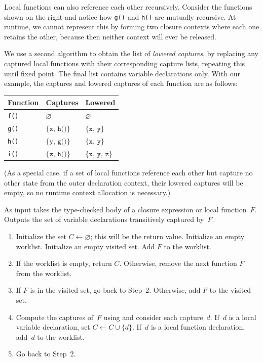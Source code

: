 \documentclass[../generics]{subfiles}
\begin{document}
Local functions can also reference each other recursively. Consider the functions shown on the right and notice how \texttt{g()} and \texttt{h()} are mutually recursive. At runtime, we cannot represent this by forming two closure contexts where each one retains the other, because then neither context will ever be released.

We use a second algorithm to obtain the list of \emph{lowered captures}, by replacing any captured local functions with their corresponding capture lists, repeating this until fixed point. The final list contains variable declarations only. With our example, the captures and lowered captures of each function are as follows:

\begin{center}
\begin{tabular}{lll}
\toprule
\textbf{Function}&\textbf{Captures}&\textbf{Lowered}\\
\midrule
\texttt{f()}&$\varnothing$&$\varnothing$\\
\texttt{g()}&$\{\texttt{x},\,\texttt{h()}\}$&$\{\texttt{x},\,\texttt{y}\}$\\
\texttt{h()}&$\{\texttt{y},\,\texttt{g()}\}$&$\{\texttt{x},\,\texttt{y}\}$\\
\texttt{i()}&$\{\texttt{z},\,\texttt{h()}\}$&$\{\texttt{x},\,\texttt{y},\,\texttt{z}\}$\\
\bottomrule
\end{tabular}
\end{center}

(As a special case, if a set of local functions reference each other but capture no other state from the outer declaration context, their lowered captures will be empty, so no runtime context allocation is necessary.)

\begin{algorithm}\label{lowered closure captures algorithm}
As input takes the type-checked body of a closure expression or local function~$F$. Outputs the set of variable declarations transitively captured by~$F$.
\begin{enumerate}
\item Initialize the set $C\leftarrow\varnothing$; this will be the return value. Initialize an empty worklist. Initialize an empty visited set. Add $F$ to the worklist.
\item If the worklist is empty, return $C$. Otherwise, remove the next function $F$ from the worklist.
\item If $F$ is in the visited set, go back to Step~2. Otherwise, add $F$ to the visited set.
\item Compute the captures of~$F$ using  and consider each capture~$d$. If~$d$ is a local variable declaration, set $C\leftarrow C\cup\{d\}$. If~$d$ is a local function declaration, add~$d$ to the worklist.
\item Go back to Step~2.
\end{enumerate}
\end{algorithm}
\end{document}
